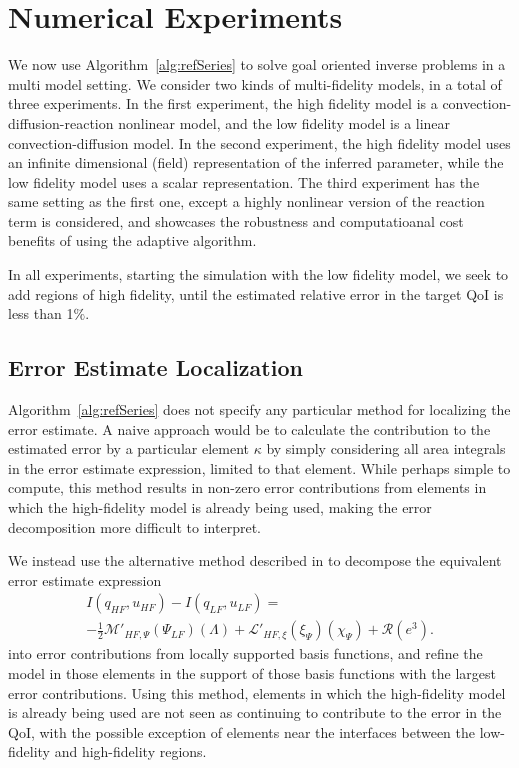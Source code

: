 \section{Numerical Experiments}\label{sect:numexp}
%
We now use Algorithm~\ref{alg:refSeries} to solve goal oriented inverse problems in a multi model setting. We consider two kinds of multi-fidelity models, in a total of three experiments. In the first experiment, the high fidelity model is a convection-diffusion-reaction nonlinear model, and the low fidelity model is a linear convection-diffusion model. In the second experiment, the high fidelity model uses an infinite dimensional (field) representation of the inferred parameter, while the low fidelity model uses a scalar representation. The third experiment has the same setting as the first one, except a highly nonlinear version of the reaction term is considered, and showcases the robustness and computatioanal cost benefits of using the adaptive algorithm.

In all experiments, starting the simulation with the low fidelity model, we seek to add regions of high fidelity, until the estimated relative error in the target QoI is less than 1$\%$. 
%
\subsection{Error Estimate Localization}
%
Algorithm~\ref{alg:refSeries} does not specify any particular method for localizing the error estimate. A naive approach would be to calculate the contribution to the estimated error by a particular element $\kappa$ by simply considering all area integrals in the error estimate expression, limited to that element. While perhaps simple to compute, this method results in non-zero error contributions from elements in which the high-fidelity model is already being used, making the error decomposition more difficult to interpret.

We instead use the alternative method described in \cite{vanOpstaletal15} to decompose the equivalent error estimate expression
%
\begin{multline}
I(q_{HF},u_{HF})-I(q_{LF},u_{LF})=\\-\frac{1}{2}\mathcal{M}'_{HF,\Psi}(\Psi_{LF})(\Lambda)+\mathcal{L}'_{HF,\xi}(\xi_\Psi)(\chi_\Psi)+\mathcal{R}(e^3). \nonumber
\end{multline}
%
into error contributions from locally supported basis functions, and refine the model in those elements in the support of those basis functions with the largest error contributions. Using this method, elements in which the high-fidelity model is already being used are not seen as continuing to contribute to the error in the QoI, with the possible exception of elements near the interfaces between the low-fidelity and high-fidelity regions. 
%
